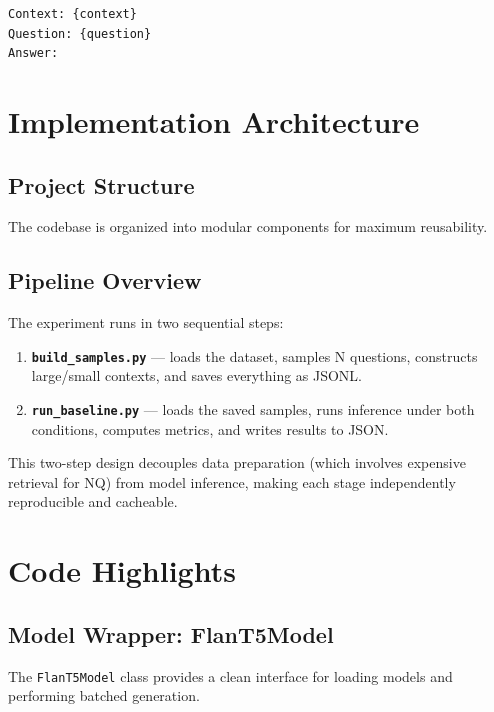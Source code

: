 \documentclass[11pt,a4paper]{article}
\begin{document}
\begin{lstlisting}[caption=Prompt template, label=lst:prompt]
Context: {context}
Question: {question}
Answer:
\end{lstlisting}

\section{Implementation Architecture}

\subsection{Project Structure}

The codebase is organized into modular components for maximum reusability. 



\subsection{Pipeline Overview}

The experiment runs in two sequential steps:

\begin{enumerate}
    \item \textbf{\texttt{build\_samples.py}} — loads the dataset, samples N questions, constructs large/small contexts, and saves everything as JSONL.
    \item \textbf{\texttt{run\_baseline.py}} — loads the saved samples, runs inference under both conditions, computes metrics, and writes results to JSON.
\end{enumerate}

This two-step design decouples data preparation (which involves expensive retrieval for NQ) from model inference, making each stage independently reproducible and cacheable.

\section{Code Highlights}

\subsection{Model Wrapper: FlanT5Model}

The \texttt{FlanT5Model} class provides a clean interface for loading models and performing batched generation.
\end{document}
